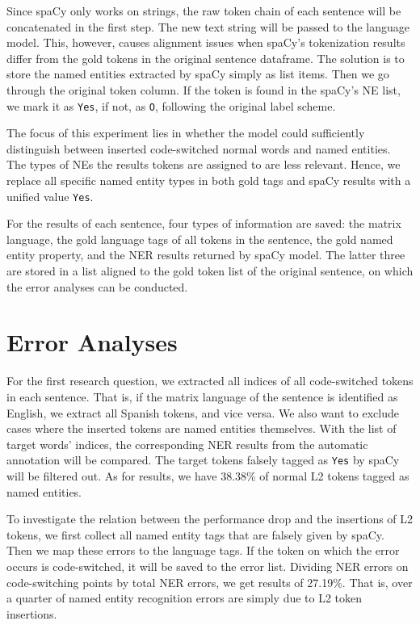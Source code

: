 \documentclass[11pt]{article}
\begin{document}
Since spaCy only works on strings, the raw token chain of each sentence will be concatenated in the first step. The new text string will be passed to the language model. This, however, causes alignment issues when spaCy's tokenization results differ from the gold tokens in the original sentence dataframe. The solution is to store the named entities extracted by spaCy simply as list items. Then we go through the original token column. If the token is found in the spaCy's NE list, we mark it as \texttt{Yes}, if not, as \texttt{O}, following the original label scheme.

The focus of this experiment lies in whether the model could sufficiently distinguish between inserted code-switched normal words and named entities. The types of NEs the results tokens are assigned to are less relevant. Hence, we replace all specific named entity types in both gold tags and spaCy results with a unified value \texttt{Yes}. 

For the results of each sentence, four types of information are saved: the matrix language, the gold language tags of all tokens in the sentence, the gold named entity property, and the NER results returned by spaCy model. The latter three are stored in a list aligned to the gold token list of the original sentence, on which the error analyses can be conducted.


\section{Error Analyses}

For the first research question, we extracted all indices of all code-switched tokens in each sentence. That is, if the matrix language of the sentence is identified as English, we extract all Spanish tokens, and vice versa. We also want to exclude cases where the inserted tokens are named entities themselves. With the list of target words' indices, the corresponding NER results from the automatic annotation will be compared. The target tokens falsely tagged as \texttt{Yes} by spaCy will be filtered out. As for results, we have 38.38\% of normal L2 tokens tagged as named entities.

To investigate the relation between the performance drop and the insertions of L2 tokens, we first collect all named entity tags that are falsely given by spaCy. Then we map these errors to the language tags. If the token on which the error occurs is code-switched, it will be saved to the error list. Dividing NER errors on code-switching points by total NER errors, we get results of 27.19\%. That is, over a quarter of named entity recognition errors are simply due to L2 token insertions.
\end{document}
